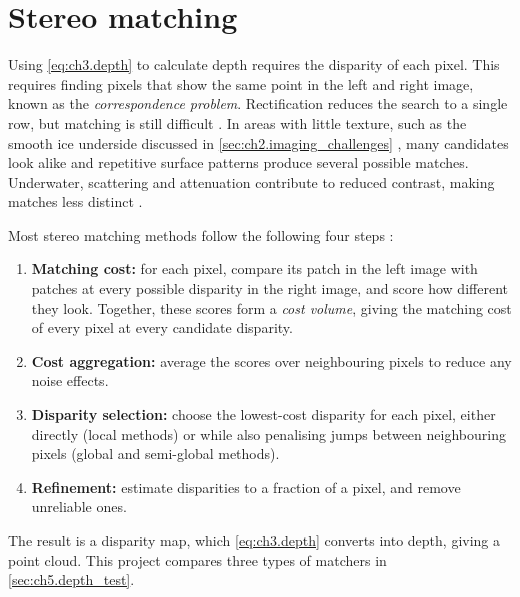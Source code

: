 \section{Stereo matching}
\label{sec:ch3.stereo_matching}
Using \autoref{eq:ch3.depth} to calculate depth requires the disparity of each pixel. 
This requires finding pixels that show the same point in the left and right image, known as the \textit{correspondence problem}. 
Rectification reduces the search to a single row, but matching is still difficult \cite{scharsteinTaxonomyEvaluationDense2002}.
In areas with little texture, such as the smooth ice underside discussed in \autoref{sec:ch2.imaging_challenges} \cite{langeDevelopmentSeaIce1989,zhaoModifyingAffordableROV2021},
many candidates look alike and repetitive surface patterns produce several possible matches.
Underwater, scattering and attenuation contribute to reduced contrast, making matches less distinct
\cite{jaffeComputerModelingDesign1990,roserSimultaneousUnderwaterVisibility2014}.

Most stereo matching methods follow the following four steps \cite{scharsteinTaxonomyEvaluationDense2002}:
\begin{enumerate}
	\item \textbf{Matching cost:} for each pixel, compare its patch in the left image with patches at every possible 
	disparity in the right image, and score how different they look. Together, these scores form a \textit{cost volume}, giving the matching cost of every pixel at every candidate disparity.
	\item \textbf{Cost aggregation:} average the scores over neighbouring pixels to reduce any noise effects.
	\item \textbf{Disparity selection:} choose the lowest-cost disparity for each pixel, either directly (local methods) or while also penalising jumps between neighbouring pixels (global and semi-global methods).
	\item \textbf{Refinement:} estimate disparities to a fraction of a pixel, and remove unreliable ones.
\end{enumerate}
The result is a disparity map, which \autoref{eq:ch3.depth} converts into depth, giving a point cloud.
This project compares three types of matchers in \autoref{sec:ch5.depth_test}.


